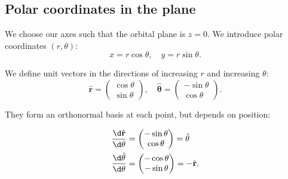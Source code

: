 \documentclass[a4paper]{article}
\begin{document}
\subsection{Polar coordinates in the plane}
We choose our axes such that the orbital plane is $z = 0$. We introduce polar coordinates $(r, \theta)$:
\[
  x = r\cos\theta, \quad y = r\sin \theta.
\]
\begin{notation}
  We define unit vectors in the directions of increasing $r$ and increasing $\theta$:
  \[
    \hat{\mathbf{r}} = \begin{pmatrix}\cos \theta\\ \sin \theta\end{pmatrix}, \quad \hat{\mathbf{\theta}} = \begin{pmatrix}-\sin \theta\\\cos\theta \end{pmatrix}.
  \]
  \begin{center}
  \end{center}
  They form an orthonormal basis at each point, but depends on position:
\end{notation}
\begin{prop}
  \begin{align*}
    \frac{\d \hat{\mathbf{r}}}{\d \theta} &= \begin{pmatrix} -\sin \theta\\ \cos \theta\end{pmatrix} = \hat{\theta}\\
    \frac{\d \hat{\theta}}{\d \theta} &= \begin{pmatrix}-\cos \theta\\ -\sin \theta\end{pmatrix} = -\hat{\mathbf{r}}.
  \end{align*}
\end{prop}
\end{document}
